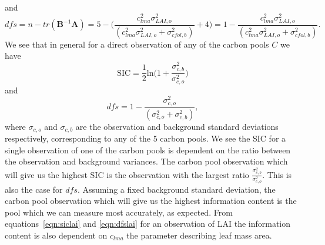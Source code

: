 \documentclass[11pt]{article}
\begin{document}
and 
\begin{equation}
dfs = n - tr(\textbf{B}^{-1}\textbf{A}) = 5 - \bigg(\frac{c_{lma}^2 \sigma_{LAI,o}^{2}}{(c_{lma}^2 \sigma_{LAI,o}^{2}+\sigma_{cfol,b}^{2})} + 4 \bigg) = 1 -\frac{c_{lma}^2 \sigma_{LAI,o}^{2}}{(c_{lma}^2 \sigma_{LAI,o}^{2}+\sigma_{cfol,b}^{2})}. \label{eqn:dfslai}
\end{equation}
We see that in general for a direct observation of any of the carbon pools $C$ we have
\begin{equation}
\text{SIC} =\frac{1}{2}\text{ln} \bigg(1+\frac{\sigma_{c,b}^{2}}{\sigma_{c,o}^{2}}\bigg) \label{eqn:sicC}
\end{equation}
and 
\begin{equation}
dfs = 1 -\frac{\sigma_{c,o}^{2}}{(\sigma_{c,o}^{2}+\sigma_{c,b}^{2})}, \label{eqn:dfsC}
\end{equation}
where $\sigma_{c,o}$ and $\sigma_{c,b}$ are the observation and background standard deviations respectively, corresponding to any of the 5 carbon pools.
We see the SIC for a single observation of one of the carbon pools is dependent on the ratio between the observation and background variances. The carbon pool observation which will give us the highest SIC is the observation with the largest ratio $\frac{\sigma_{c,b}^{2}}{\sigma_{c,o}^{2}}$. This is also the case for $dfs$. Assuming a fixed background standard deviation, the carbon pool observation which will give us the highest information content is the pool which we can measure most accurately, as expected. From equations~\eqref{eqn:siclai} and \eqref{eqn:dfslai} for an observation of LAI the information content is also dependent on $c_{lma}$ the parameter describing leaf mass area.
\end{document}

